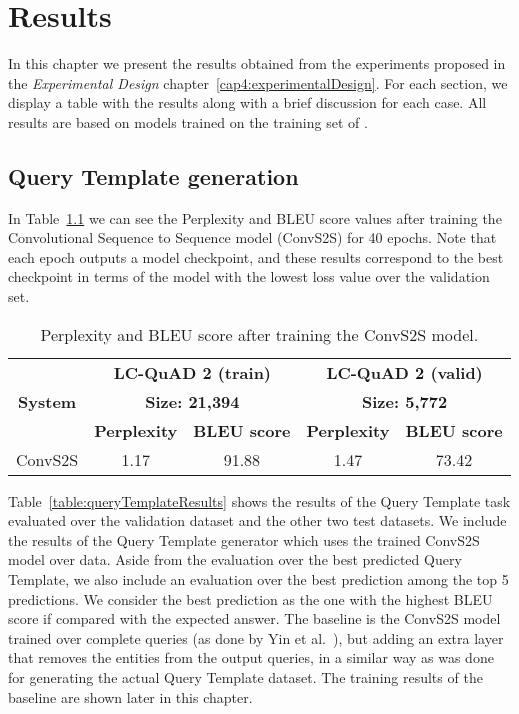 \chapter{Results}
\label{cap5:results}
In this chapter we present the results obtained from the experiments proposed in the 
\textit{Experimental Design} chapter~\ref{cap4:experimentalDesign}. For each section, we 
display a table with the results 
along with a brief discussion for each case. All results are based on models trained on the 
training set of \LCQuADtwo{}.

\section{Query Template generation}
\label{cap5:results/queryTemplate}
In Table~\ref{table:queryTemplateTraining} we can see the Perplexity and BLEU score values after 
training the Convolutional Sequence to Sequence model (ConvS2S) for 40 epochs. Note that each 
epoch outputs a model checkpoint, and these results correspond to the best checkpoint in terms 
of the model with the lowest loss value over the validation set.

\begin{table}[h!]
    \centering
    \begin{tabular}{|c|cc|cc|}
        \hline
        \multirow{3}{*}{\textbf{System}} & \multicolumn{2}{c|}{\textbf{LC-QuAD 2 (train)}}       & \multicolumn{2}{c|}{\textbf{LC-QuAD 2 (valid)}}       \\ \cline{2-5} 
                                & \multicolumn{2}{c|}{\textbf{Size: 21,394}}            & \multicolumn{2}{c|}{\textbf{Size: 5,772}}             \\ \cline{2-5} 
                                & \multicolumn{1}{c|}{\textbf{Perplexity}} & \textbf{BLEU score} & \multicolumn{1}{c|}{\textbf{Perplexity}} & \textbf{BLEU score} \\ \hline
        ConvS2S                 & 1.17                            & 91.88      & 1.47                            & 73.42      \\ \hline
    \end{tabular}
    \caption{Perplexity and BLEU score after training the ConvS2S model.}
    \label{table:queryTemplateTraining}
\end{table}

Table~\ref{table:queryTemplateResults} shows the results of the Query Template task evaluated 
over the \LCQuADtwo{} validation dataset and the other two test datasets. We include the results of 
the Query Template generator which uses the trained ConvS2S model over \LCQuADtwo{} data. Aside 
from the evaluation over the best predicted Query Template, we also include an evaluation over 
the best prediction among the top 5 predictions. We consider the best prediction as the one with 
the highest BLEU score if compared with the expected answer. The baseline is the ConvS2S model 
trained over complete \SPARQL{} queries (as done by Yin et al.~\cite{nmt:nl-to-sparql-Yin19}), but 
adding an extra layer that removes the entities from the output \SPARQL{} queries, in a similar way 
as was done for generating the actual \LCQuADtwo{} Query Template dataset. The training results of 
the baseline are shown later in this chapter.

